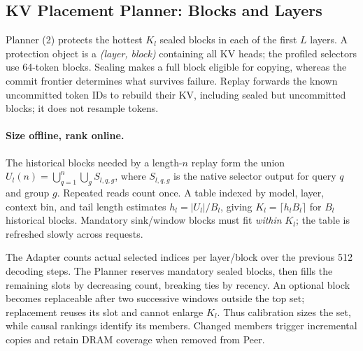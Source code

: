 \subsection{KV Placement Planner: Blocks and Layers}
\label{sec:kv-placement}

Planner (2) protects the hottest $K_l$ sealed blocks in each of the
first $L$ layers. A protection object is a \emph{(layer, block)} containing
all KV heads; the profiled selectors use 64-token blocks.
Sealing makes a full block eligible for copying, whereas the commit
frontier determines what survives failure. Replay forwards the known
uncommitted token IDs to rebuild their KV, including sealed but
uncommitted blocks; it does not resample tokens.

\paragraph{Size offline, rank online.}
The historical blocks needed by a length-$n$ replay form the union
$U_l(n)=\bigcup_{q=1}^{n}\bigcup_g S_{l,q,g}$, where $S_{l,q,g}$ is the
native selector output for query $q$ and group $g$. Repeated reads count
once. A table indexed by model, layer, context bin, and tail length
estimates $h_l=|U_l|/B_l$, giving $K_l=\lceil h_l B_l\rceil$ for $B_l$
historical blocks. Mandatory sink/window blocks must fit \emph{within}
$K_l$; the table is refreshed slowly across requests.

The Adapter counts actual selected indices per layer/block over the
previous 512 decoding steps. The Planner reserves mandatory sealed
blocks, then fills the remaining slots by decreasing count, breaking
ties by recency. An optional block becomes replaceable after two
successive windows outside the top set; replacement reuses its slot
and cannot enlarge $K_l$. Thus calibration sizes the set, while causal
rankings identify its members. Changed members trigger incremental
copies and retain DRAM coverage when removed from Peer.

